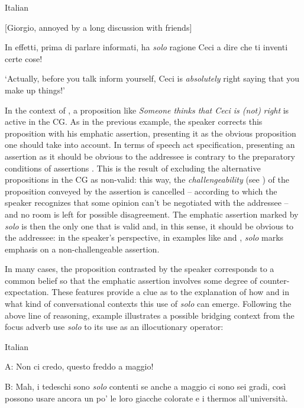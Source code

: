\ea%
    \label{ex:key:95}

          Italian \citep[124]{Favaro2020}

[Giorgio, annoyed by a long discussion with friends]

In effetti, prima di parlare informati, ha \textit{solo} ragione Ceci a dire che ti inventi certe cose!

\glt ‘Actually, before you talk inform yourself, Ceci is \textit{absolutely} right saying that you make up things!’
    \z %

In the context of , a proposition like \textit{Someone thinks that Ceci is (not)}\textbf{ }\textit{right} is active in the CG. As in the previous example, the speaker corrects this proposition with his emphatic assertion, presenting it as the obvious proposition one should take into account. In terms of speech act specification, presenting an assertion as it should be obvious to the addressee is contrary to the preparatory conditions of assertions \citep[66]{Searle1969}. This is the result of excluding the alternative propositions in the CG as non-valid: this way, the \textit{challengeability} (see \citealt{Kroon1995}) of the proposition conveyed by the assertion is cancelled – according to which the speaker recognizes that some opinion can’t be negotiated with the addressee – and no room is left for possible disagreement. The emphatic assertion marked by \textit{solo} is then the only one that is valid and, in this sense, it should be obvious to the addressee: in the speaker’s perspective, in examples like  and , \textit{solo} marks emphasis on a non-challengeable assertion.

In many cases, the proposition contrasted by the speaker corresponds to a common belief so that the emphatic assertion involves some degree of counter-expectation. These features provide a clue as to the explanation of how and in what kind of conversational contexts this use of \textit{solo} can emerge. Following the above line of reasoning, example  illustrates a possible bridging context from the focus adverb use \textit{solo} to its use as an illocutionary operator:

\ea%
    \label{ex:key:96}

          Italian \citep[125]{Favaro2020}

  A:  Non ci credo, questo freddo a maggio!

B:  Mah, i tedeschi sono \textit{solo} contenti se anche a maggio ci sono sei gradi, così  possono usare ancora un po’ le loro giacche colorate e i thermos all’università.


